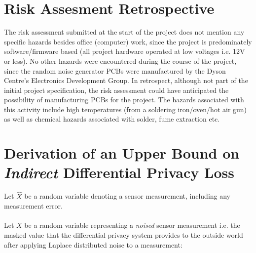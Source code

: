 \documentclass[12pt]{article}
\begin{document}
\newpage

\begin{appendix}


  \section{Risk Assesment Retrospective}
    The risk assessment submitted at the start of the project does not mention any specific hazards besides office (computer) work, since the project is predominately software/firmware based (all project hardware operated at low voltages i.e. 12V or less). No other hazards were encountered during the course of the project, since the random noise generator PCBs were manufactured by the Dyson Centre's Electronics Development Group. In retrospect, although not part of the initial project specification, the risk assessment could have anticipated the possibility of manufacturing PCBs for the project. The hazards associated with this activity include high temperatures (from a soldering iron/oven/hot air gun) as well as chemical hazards associated with solder, fume extraction etc.




  \section{Derivation of an Upper Bound on \textit{Indirect} Differential Privacy Loss}
    Let $\hat{X}$ be a random variable denoting a sensor measurement, including any measurement error.
    \\
    \\
    Let $X$ be a random variable representing a \textit{noised} sensor measurement i.e. the masked value that the differential privacy system provides to the outside world after applying Laplace distributed noise to a measurement:


\end{appendix}
\end{document}
